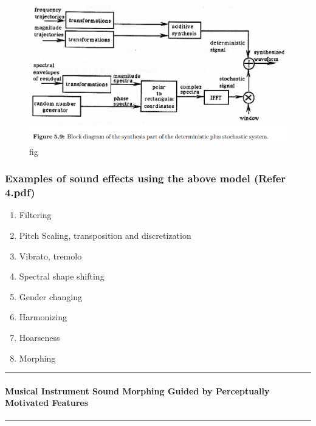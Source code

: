 \documentclass[11pt]{article}
\makeatletter
\def\maxwidth{\ifdim\Gin@nat@width>\linewidth\linewidth
    \else\Gin@nat@width\fi}
\let\Oldincludegraphics\includegraphics
\renewcommand{\includegraphics}[1]{\Oldincludegraphics[width=.8\maxwidth]{#1}}
\providecommand{\tightlist}{%
      \setlength{\itemsep}{0pt}\setlength{\parskip}{0pt}}
\makeatother
\begin{document}
\begin{figure}
\centering
\includegraphics{fig_8.png}
\caption{fig}
\end{figure}

    \subsubsection{Examples of sound effects using the above model (Refer
4.pdf)}\label{examples-of-sound-effects-using-the-above-model-refer-4.pdf}

\begin{enumerate}
\def\labelenumi{\arabic{enumi}.}
\tightlist
\item
  Filtering
\item
  Pitch Scaling, transposition and discretization
\item
  Vibrato, tremolo
\item
  Spectral shape shifting
\item
  Gender changing
\item
  Harmonizing
\item
  Hoarseness
\item
  Morphing
\end{enumerate}

    \begin{center}\rule{0.5\linewidth}{\linethickness}\end{center}

\paragraph{Musical Instrument Sound Morphing Guided by Perceptually
Motivated
Features}\label{musical-instrument-sound-morphing-guided-by-perceptually-motivated-features}

\begin{center}\rule{0.5\linewidth}{\linethickness}\end{center}
\end{document}

